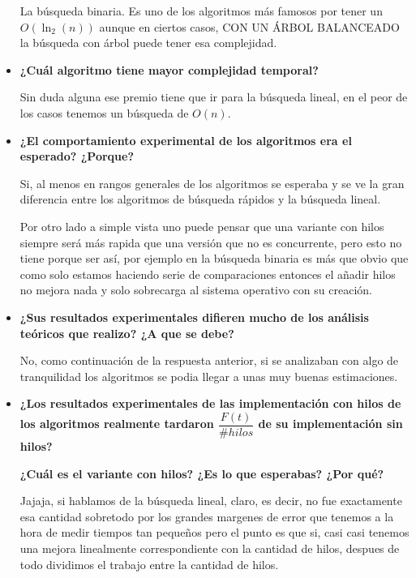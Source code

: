 \documentclass[12pt, fleqn]{article}                             %
\theoremstyle{break}                                            %
\begin{document}
\begin{itemize}
                La búsqueda binaria. Es uno de los algoritmos más famosos por tener un $O(\ln_2(n))$
                aunque en ciertos casos, CON UN ÁRBOL BALANCEADO la búsqueda con árbol puede tener esa
                complejidad.

            \clearpage

            \item
                \textbf{¿Cuál algoritmo tiene mayor complejidad temporal?}

                Sin duda alguna ese premio tiene que ir para la búsqueda lineal, en el peor de los casos
                tenemos un búsqueda de $O(n)$.
            \item
                \textbf{¿El comportamiento experimental de los algoritmos era el esperado? ¿Porque?}

                Si, al menos en rangos generales de los algoritmos se esperaba y se ve la gran diferencia entre
                los algoritmos de búsqueda rápidos y la búsqueda lineal.

                Por otro lado a simple vista uno puede pensar que una variante con hilos siempre será más rapida
                que una versión que no es concurrente, pero esto no tiene porque ser así, por ejemplo
                en la búsqueda binaria es más que obvio que como solo estamos haciendo serie de comparaciones
                entonces el añadir hilos no mejora nada y solo sobrecarga al sistema operativo con su creación.

            \item
                \textbf{¿Sus resultados experimentales difieren mucho de los análisis teóricos
                    que realizo? ¿A que se debe?}

                No, como continuación de la respuesta anterior, si se analizaban con algo de tranquilidad
                los algoritmos se podia llegar a unas muy buenas estimaciones.

            \item
                \textbf{¿Los resultados experimentales de las implementación con hilos de los
                algoritmos realmente tardaron $\dfrac{F(t)}{\#hilos}$ de su implementación sin hilos?}

                \textbf{¿Cuál es el %
                variante con hilos? ¿Es lo que esperabas? ¿Por qué?}

                Jajaja, si hablamos de la búsqueda lineal, claro, es decir, no fue exactamente esa cantidad
                sobretodo por los grandes margenes de error que tenemos a la hora de medir tiempos
                tan pequeños pero el punto es que si, casi casi tenemos una mejora linealmente correspondiente
                con la cantidad de hilos, despues de todo dividimos el trabajo entre la cantidad de hilos.


\end{itemize}
\end{document}
